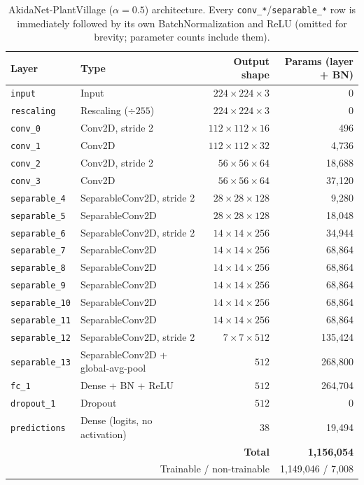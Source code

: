 \documentclass[11pt]{article}
\newcommand{\code}[1]{\texttt{#1}}
\begin{document}
\begin{table}[H]
\centering
\caption{AkidaNet-PlantVillage ($\alpha=0.5$) architecture. Every \code{conv\_*}/\code{separable\_*} row is immediately followed by its own BatchNormalization and ReLU (omitted for brevity; parameter counts include them).}
\label{tab:arch}
\begin{tabular}{@{}llrr@{}}
\toprule
Layer & Type & Output shape & Params (layer + BN) \\
\midrule
\code{input} & Input & $224\times224\times3$ & 0 \\
\code{rescaling} & Rescaling ($\div 255$) & $224\times224\times3$ & 0 \\
\code{conv\_0} & Conv2D, stride 2 & $112\times112\times16$ & 496 \\
\code{conv\_1} & Conv2D & $112\times112\times32$ & 4{,}736 \\
\code{conv\_2} & Conv2D, stride 2 & $56\times56\times64$ & 18{,}688 \\
\code{conv\_3} & Conv2D & $56\times56\times64$ & 37{,}120 \\
\code{separable\_4} & SeparableConv2D, stride 2 & $28\times28\times128$ & 9{,}280 \\
\code{separable\_5} & SeparableConv2D & $28\times28\times128$ & 18{,}048 \\
\code{separable\_6} & SeparableConv2D, stride 2 & $14\times14\times256$ & 34{,}944 \\
\code{separable\_7} & SeparableConv2D & $14\times14\times256$ & 68{,}864 \\
\code{separable\_8} & SeparableConv2D & $14\times14\times256$ & 68{,}864 \\
\code{separable\_9} & SeparableConv2D & $14\times14\times256$ & 68{,}864 \\
\code{separable\_10} & SeparableConv2D & $14\times14\times256$ & 68{,}864 \\
\code{separable\_11} & SeparableConv2D & $14\times14\times256$ & 68{,}864 \\
\code{separable\_12} & SeparableConv2D, stride 2 & $7\times7\times512$ & 135{,}424 \\
\code{separable\_13} & SeparableConv2D + global-avg-pool & $512$ & 268{,}800 \\
\code{fc\_1} & Dense + BN + ReLU & $512$ & 264{,}704 \\
\code{dropout\_1} & Dropout & $512$ & 0 \\
\code{predictions} & Dense (logits, no activation) & $38$ & 19{,}494 \\
\midrule
\multicolumn{3}{r}{\textbf{Total}} & \textbf{1{,}156{,}054} \\
\multicolumn{3}{r}{Trainable / non-trainable} & 1{,}149{,}046 / 7{,}008 \\
\bottomrule
\end{tabular}
\end{table}
\end{document}
